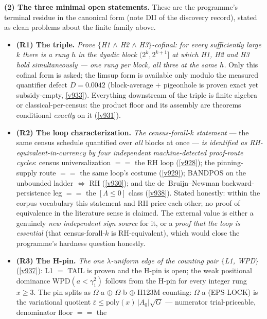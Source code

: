 \par\smallskip\noindent\textbf{(2) The three minimal open statements.}  These are the
programme's terminal residue in the canonical form (note DII of the discovery record), stated
as clean problems about the finite family above.
\begin{itemize}
\item \textbf{(R1) The triple.}  \emph{Prove $\{$H1 $\wedge$ H2 $\wedge$ H3$\}$-cofinal: for
  every sufficiently large $k$ there is a rung $h$ in the dyadic block $(2^k, 2^{k+1}]$ at
  which H1, H2 and H3 hold simultaneously --- one rung per block, all three at the same $h$.}
  Only this cofinal form is asked; the limsup form is available only modulo the measured
  quantifier defect $D = 0.0042$ (block-average $+$ pigeonhole is proven exact yet
  subsidy-empty, \vref{v933}).  Everything downstream of the triple is finite algebra or
  classical-per-census: the product floor and its assembly are theorems conditional
  \emph{exactly} on it (\vref{v931}).
\item \textbf{(R2) The loop characterization.}  \emph{The census-forall-$k$ statement} ---
  the same census schedule quantified over \emph{all} blocks at once --- \emph{is identified
  as RH-equivalent-in-currency by four independent machine-detected proof-route cycles}:
  census universalization $==$ the RH loop (\vref{v928}); the pinning-supply route $==$ the
  same loop's costume (\vref{v929}); BANDPOS on the unbounded ladder $\iff$ RH (\vref{v930});
  and the de~Bruijn--Newman backward-persistence leg $==$ the $[\Lambda \le 0]$ class
  (\vref{v938}).  Stated honestly: within the corpus vocabulary this statement and RH price
  each other; no proof of equivalence in the literature sense is claimed.  The external value
  is either a genuinely \emph{new independent sign source} for it, or a \emph{proof that the
  loop is essential} (that census-forall-$k$ is RH-equivalent), which would close the
  programme's hardness question honestly.
\item \textbf{(R3) The H-pin.}  \emph{The one $\lambda$-uniform edge of the counting pair
  $\{$L1, WPD$\}$} (\vref{v937}): L1 $=$ TAIL is proven and the H-pin is open; the weak
  positional dominance WPD$(a < \gamma_1^2)$ follows from the H-pin for every integer rung
  $x \ge 3$.  The pin splits as $\Omega$-a $\oplus$ $\Omega$-b $\oplus$ H123M counting:
  $\Omega$-a (EPS-LOCK) is the variational quotient $\bar\varepsilon \le
  \mathrm{poly}(x)\,|A_0|\sqrt G$ --- numerator trial-priceable, denominator floor $==$ the

\end{itemize}
